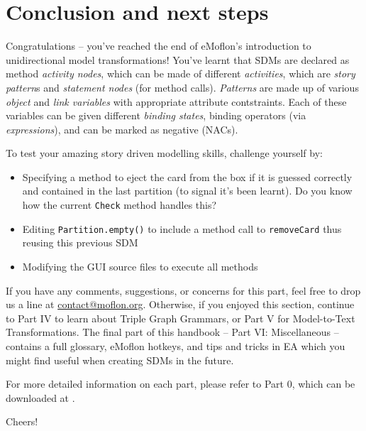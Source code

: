 \genHeader
\section{Conclusion and next steps}

\vspace{0.5cm}

Congratulations -- you've reached the end of eMoflon's introduction to unidirectional model transformations! You've learnt that SDMs are declared as method
\emph{activity nodes}, which can be made of different \emph{activities}, which are \emph{story pattern}s and \emph{statement nodes} (for method calls).
\emph{Patterns} are made up of various \emph{object} and \emph{link variables} with appropriate attribute contstraints. Each of these variables can be given
different \emph{binding states}, binding operators (via \emph{expressions}), and can be marked as negative (NACs).

\vspace{0.5cm}

To test your amazing story driven modelling skills, challenge yourself by:
\begin{itemize}
\item Specifying a method to eject the card from the box if it is guessed correctly and contained in the last partition (to signal it's been learnt). Do you
know how the current \texttt{Check} method handles this?
\item Editing \texttt{Partition.empty()} to include a method call to \texttt{removeCard} thus reusing this previous SDM
\item Modifying the GUI source files to execute all methods
\end{itemize}

\vspace{0.5cm}
	
If you have any comments, suggestions, or concerns for this part, feel free to drop us a line at \href{mailto:contact@moflon.org}{contact@moflon.org}.
Otherwise, if you enjoyed this section, continue to Part IV to learn about Triple Graph Grammars, or Part V for Model-to-Text Transformations.
The final part of this handbook -- Part VI: Miscellaneous -- contains a full glossary, eMoflon hotkeys, and tips and tricks in EA which you might find
useful when creating SDMs in the future.

For more detailed information on each part, please refer to Part 0, which can be downloaded at \dlPartZero.
\vspace{0.5cm}

Cheers!
